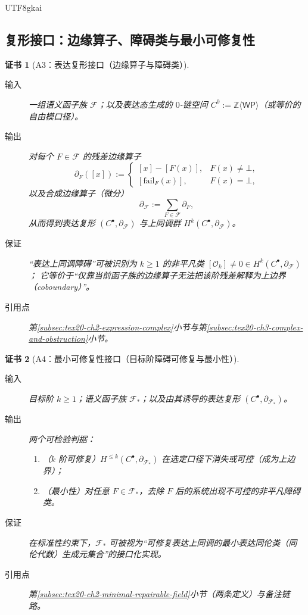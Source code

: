 \documentclass[12pt]{article}
\newtheorem{Certificate}{证书}[section]
\begin{document}
\begin{CJK*}{UTF8}{gkai}
\subsection{复形接口：边缘算子、障碍类与最小可修复性}
\label{subsec:tex20-appA-complex}

\begin{Certificate}[A3：表达复形接口（边缘算子与障碍类）]
\label{cert:tex20-appA-expression-complex-interface}
\begin{description}
  \item[输入] 一组语义函子族 $\mathcal{F}$；以及表达态生成的 $0$-链空间
  $C^0:=\mathbb{Z}\langle \mathsf{WP}\rangle$（或等价的自由模口径）。
  \item[输出] 对每个 $F\in\mathcal{F}$ 的残差边缘算子
  \[
  \partial_F([x]):=
  \begin{cases}
    [x]-[F(x)], & F(x)\neq\bot,\\
    [\mathrm{fail}_F(x)], & F(x)=\bot,
  \end{cases}
  \]
  以及合成边缘算子（微分）
  \[
  \partial_{\mathcal{F}}:=\sum_{F\in\mathcal{F}}\partial_F,
  \]
  从而得到表达复形 $(C^\bullet,\partial_{\mathcal{F}})$ 与上同调群 $H^k(C^\bullet,\partial_{\mathcal{F}})$。
  \item[保证] “表达上同调障碍”可被识别为 $k\ge 1$ 的非平凡类 $[\mathcal{O}_k]\neq 0\in H^k(C^\bullet,\partial_{\mathcal{F}})$；
  它等价于“仅靠当前函子族的边缘算子无法把该阶残差解释为上边界（coboundary）”。
  \item[引用点] 第\ref{subsec:tex20-ch2-expression-complex}小节与第\ref{subsec:tex20-ch3-complex-and-obstruction}小节。
\end{description}
\end{Certificate}

\begin{Certificate}[A4：最小可修复性接口（目标阶障碍可修复与最小性）]
\label{cert:tex20-appA-minimal-repairable-interface}
\begin{description}
  \item[输入] 目标阶 $k\ge 1$；语义函子族 $\mathcal{F}_\ast$；以及由其诱导的表达复形 $(C^\bullet,\partial_{\mathcal{F}_\ast})$。
  \item[输出] 两个可检验判据：
  \begin{enumerate}
    \item（$k$ 阶可修复）$H^{\le k}(C^\bullet,\partial_{\mathcal{F}_\ast})$ 在选定口径下消失或可控（成为上边界）；
    \item（最小性）对任意 $F\in\mathcal{F}_\ast$，去除 $F$ 后的系统出现不可控的非平凡障碍类。
  \end{enumerate}
  \item[保证] 在标准性约束下，$\mathcal{F}_\ast$ 可被视为“可修复表达上同调的最小表达同伦类（同伦代数）生成元集合”的接口化实现。
  \item[引用点] 第\ref{subsec:tex20-ch2-minimal-repairable-field}小节（两条定义）与备注链路。
\end{description}
\end{Certificate}


\end{CJK*}
\end{document}
